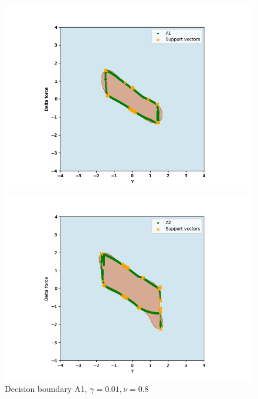             
            \begin{figure}[]
                \begin{minipage}[b]{0.5\linewidth}
                    \centering
                    \includegraphics[width = \textwidth]{figures/analysis/oneclass_servo/A1_nu_01_gamma_08.png}
                    \caption*{Decision boundary A1, $\gamma = 0.01, \nu = 0.8$}
                \end{minipage}
                \hfill
                \begin{minipage}[b]{0.5\linewidth}
                    \centering
                    \includegraphics[width = \textwidth]{figures/analysis/oneclass_servo/A2_nu_01_gamma_08.png}

\end{minipage}
\end{figure}
